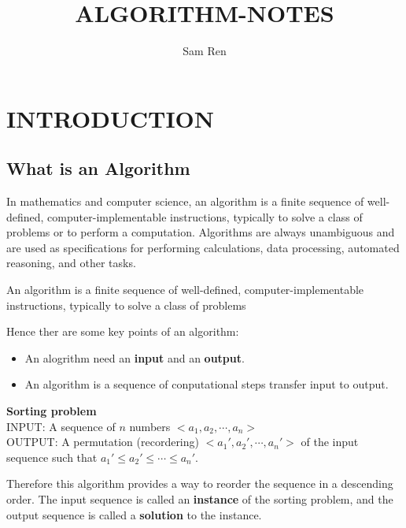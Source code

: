 \documentclass{article}
\title{ALGORITHM-NOTES}
\author{Sam Ren}
\theoremstyle{mytheoremstyle}
\theoremstyle{mytheoremstyle}
\theoremstyle{myproblemstyle}
\theoremstyle{myproblemstyle}
\begin{document}
    \maketitle
\section{INTRODUCTION}
\subsection{What is an Algorithm}
In mathematics and computer science, an algorithm is a finite sequence of well-defined, computer-implementable instructions, typically to solve a class of problems or to perform a computation. Algorithms are always unambiguous and are used as specifications for performing calculations, data processing, automated reasoning, and other tasks.
\begin{definition}[Algorithm]
  An algorithm is a finite sequence of well-defined, computer-implementable instructions, typically to solve a class of problems
\end{definition}

Hence ther are some key points of an algorithm:
\begin{itemize}
  \item An alogrithm need an \textbf{input} and an \textbf{output}.
  \item An algorithm is a sequence of conputational steps transfer input to output.
\end{itemize}

\begin{example}
 \textbf{Sorting problem}
 \\
INPUT: A sequence of $n$ numbers $<a_1,a_2,\cdots,a_n>$\\
OUTPUT: A permutation (recordering) $<a_1',a_2',\cdots,a_n'>$ of the input sequence such that $a_1'\leq a_2'\leq \cdots \leq a_n'$.
\end{example}

Therefore this algorithm provides a way to reorder the sequence in a descending order.
The input sequence is called an \textbf{instance} of the sorting problem, and the output sequence is called a \textbf{solution} to the instance.
\end{document}
